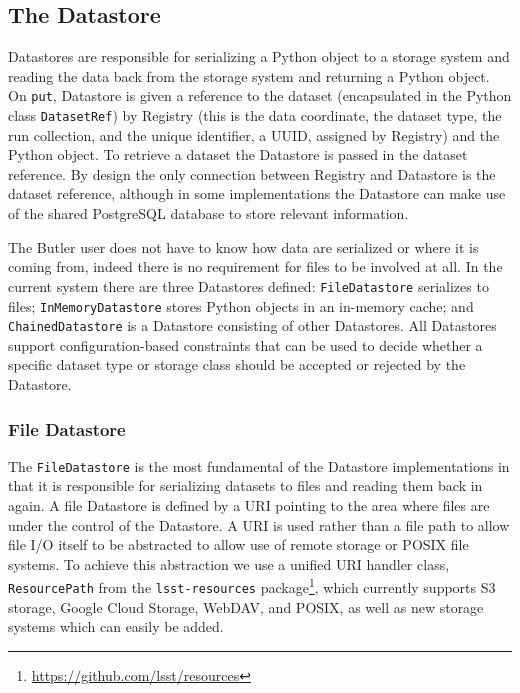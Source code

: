 \documentclass[]{spie}
\begin{document}
\subsection{The Datastore}

Datastores are responsible for serializing a Python object to a storage system and reading the data back from the storage system and returning a Python object.
On \texttt{put}, Datastore is given a reference to the dataset (encapsulated in the Python class \texttt{DatasetRef}) by Registry (this is the data coordinate, the dataset type, the run collection, and the unique identifier, a UUID,\cite{rfc4122uuid} assigned by Registry) and the Python object.
To retrieve a dataset the Datastore is passed in the dataset reference.
By design the only connection between Registry and Datastore is the dataset reference, although in some implementations the Datastore can make use of the shared PostgreSQL database to store relevant information.

The Butler user does not have to know how data are serialized or where it is coming from, indeed there is no requirement for files to be involved at all.
In the current system there are three Datastores defined: \texttt{FileDatastore} serializes to files; \texttt{InMemoryDatastore} stores Python objects in an in-memory cache; and \texttt{ChainedDatastore} is a Datastore consisting of other Datastores.
All Datastores support configuration-based constraints that can be used to decide whether a specific dataset type or storage class should be accepted or rejected by the Datastore.

\subsubsection{File Datastore}

The \texttt{FileDatastore} is the most fundamental of the Datastore implementations in that it is responsible for serializing datasets to files and reading them back in again.
A file Datastore is defined by a URI pointing to the area where files are under the control of the Datastore.
A URI is used rather than a file path to allow file I/O itself to be abstracted to allow use of remote storage or POSIX file systems.
To achieve this abstraction we use a unified URI handler class, \texttt{ResourcePath} from the \texttt{lsst-resources} package\footnote{\url{https://github.com/lsst/resources}}, which currently supports S3 storage, Google Cloud Storage, WebDAV, and POSIX, as well as new storage systems which can easily be added.
\end{document}
